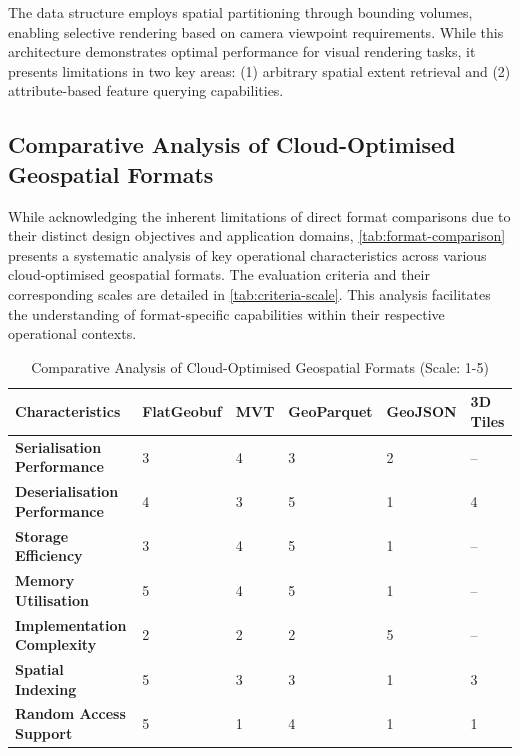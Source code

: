 The data structure employs spatial partitioning through bounding volumes, enabling selective rendering based on camera viewpoint requirements. While this architecture demonstrates optimal performance for visual rendering tasks, it presents limitations in two key areas: (1) arbitrary spatial extent retrieval and (2) attribute-based feature querying capabilities.

\subsection{Comparative Analysis of Cloud-Optimised Geospatial Formats}
\label{rw:cloud_optimised_implementations:comparison}
While acknowledging the inherent limitations of direct format comparisons due to their distinct design objectives and application domains, \autoref{tab:format-comparison} presents a systematic analysis of key operational characteristics across various cloud-optimised geospatial formats. The evaluation criteria and their corresponding scales are detailed in \autoref{tab:criteria-scale}. This analysis facilitates the understanding of format-specific capabilities within their respective operational contexts.

\begin{table}[htbp]
  \centering
  \caption{Comparative Analysis of Cloud-Optimised Geospatial Formats (Scale: 1-5)}
  \label{tab:format-comparison}
  \footnotesize
  \begin{tabular}{p{3cm}|p{1.8cm}|p{1.8cm}|p{1.8cm}|p{1.8cm}|p{1.8cm}}
    \hline
    \textbf{Characteristics} & \textbf{FlatGeobuf} & \textbf{MVT} & \textbf{GeoParquet} & \textbf{GeoJSON} & \textbf{3D Tiles} \\
    \hline
    \textbf{Serialisation Performance} & 3 & 4 & 3 & 2 & -- \\
    \hline
    \textbf{Deserialisation Performance} & 4 & 3 & 5 & 1 & 4\footnotemark[1] \\
    \hline
    \textbf{Storage Efficiency} & 3 & 4 & 5 & 1 & -- \\
    \hline
    \textbf{Memory Utilisation} & 5 & 4 & 5 & 1 & -- \\
    \hline
    \textbf{Implementation Complexity} & 2 & 2 & 2 & 5 & -- \\
    \hline
    \textbf{Spatial Indexing} & 5 & 3\footnotemark[2] & 3\footnotemark[3] & 1 & 3\footnotemark[4] \\
    \hline
    \textbf{Random Access Support} & 5 & 1 & 4 & 1 & 1 \\
    \hline
  \end{tabular}
\end{table}

